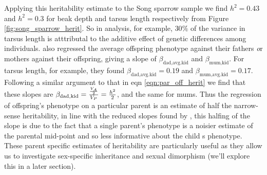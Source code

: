 Applying this heritability estimate to the Song sparrow sample we find
$h^2=0.43$ and $h^2=0.3$ for beak depth and tarsus length
respectively from Figure
\ref{fig:song_sparrow_herit}. So in \citet{smith1979heritability} analysis, for example,
$30\%$ of the variance in tarsus length is atttributal to the additive
effect of genetic
differences among individuals. 
\citet{smith1979heritability} also regressed the average offspring
phenotype against their fathers {\emph or} mothers against their
offspring, giving a slope of $\beta_{\textrm{dad}, \textrm{avg.kid}}$ and
$\beta_{\textrm{mum}, \textrm{kid}}$. For tarsus length, for
example, they found $\beta_{\textrm{dad},
  \textrm{avg.kid}}= 0.19$ and $\beta_{\textrm{mum},
  \textrm{avg.kid}}= 0.17$.  Following a similar argument to
that in eqn
\eqref{eqn:par_off_herit} we find that these slopes are $\beta_{\textrm{dad}, \textrm{kid}}=
\nicefrac{\nicefrac{V_{A}}{2}}{V_P} = \nicefrac{h^2}{2}$, and the same
  for mums. Thus the regression of offspring's phenotype on a
  particular parent is an estimate of half the narrow-sense
  heritability, in line with the reduced slopes found by
  \citet{smith1979heritability}, this halfing of the slope is due to the
  fact that a single parent's phenotype is a noisier estimate of the
  parental mid-point and so less informative about the child
  s phenotype. These parent specific estimates of heritability are
  particularly useful as they allow us to investigate sex-specific inheritance and sexual
  dimorphism (we'll explore this in a later section). 


